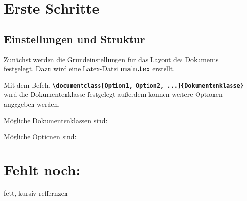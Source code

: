 \section{Erste Schritte}
\subsection{Einstellungen und Struktur}

Zunächst werden die Grundeinstellungen für das Layout des Dokuments festgelegt. Dazu wird eine Latex-Datei \textbf{main.tex} erstellt.

Mit dem Befehl \textbf{\texttt{\textbackslash documentclass[Option1, Option2, ...]\{Dokumentenklasse\}}} wird die Dokumentenklasse festgelegt außerdem können weitere Optionen angegeben werden. 

Mögliche Dokumentenklassen sind:


Mögliche Optionen sind:




\section{Fehlt noch:}

fett, kursiv
reffernzen
%
